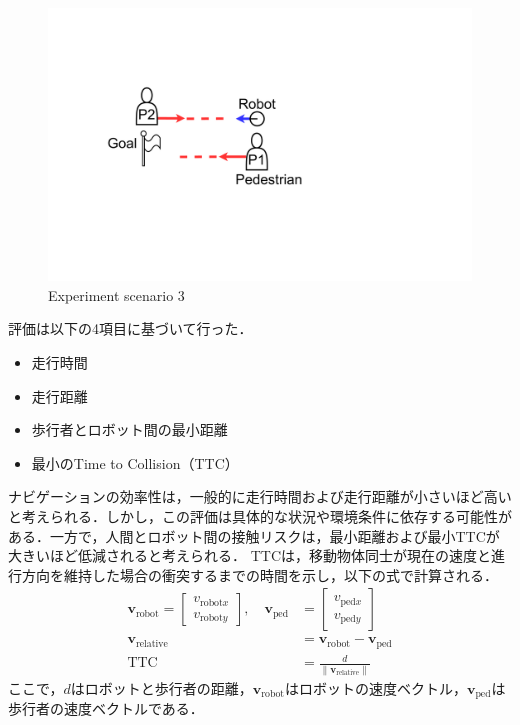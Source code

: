 \begin{figure}[H]
  \centering
  \includegraphics[keepaspectratio, scale=0.15]{images/scenario3.pdf}
  \caption{Experiment scenario 3}
  \label{Fig:scenario3}
\end{figure}


評価は以下の4項目に基づいて行った．
\begin{itemize}
  \item 走行時間
  \item 走行距離
  \item 歩行者とロボット間の最小距離
  \item 最小のTime to Collision（TTC）
\end{itemize}

ナビゲーションの効率性は，一般的に走行時間および走行距離が小さいほど高いと考えられる．しかし，この評価は具体的な状況や環境条件に依存する可能性がある．一方で，人間とロボット間の接触リスクは，最小距離および最小TTCが大きいほど低減されると考えられる．
TTCは，移動物体同士が現在の速度と進行方向を維持した場合の衝突するまでの時間を示し，以下の式で計算される．
\setlength{\jot}{1em}
\begin{align}
  \mathbf{v}_{\text{robot}} = \begin{bmatrix} v_{\text{robot}x} \\ v_{\text{robot}y} \end{bmatrix}, \quad 
  \mathbf{v}_{\text{ped}} &= \begin{bmatrix} v_{\text{ped}x} \\ v_{\text{ped}y} \end{bmatrix} \\
  \mathbf{v}_{\text{relative}} &= \mathbf{v}_{\text{robot}} - \mathbf{v}_{\text{ped}} \\
  \text{TTC} &= \frac{d}{\|\mathbf{v}_{\text{relative}}\|}
\end{align}
ここで，$d$はロボットと歩行者の距離，$\mathbf{v}_{\text{robot}}$はロボットの速度ベクトル，$\mathbf{v}_{\text{ped}}$は歩行者の速度ベクトルである．

